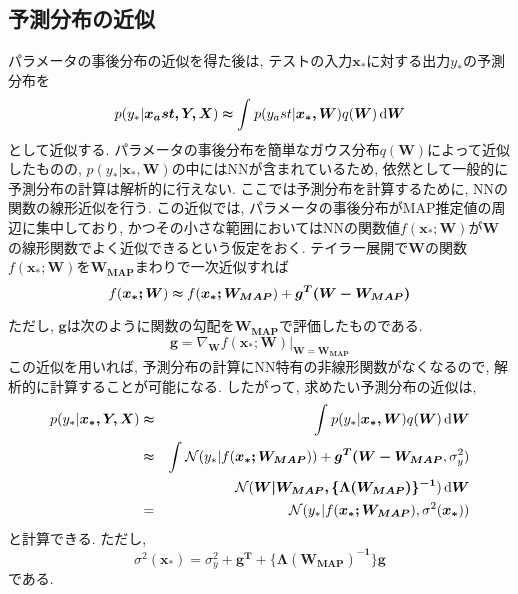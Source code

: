 \documentclass[twocolumn]{jarticle}
\begin{document}
\subsection{予測分布の近似}
パラメータの事後分布の近似を得た後は, テストの入力${\bm {x_\ast}}$に対する出力${y_\ast}$の予測分布を
\begin{equation}
  p(y_\ast|\bm {x_ast, Y, X}) \thickapprox \int_{}^{} p(y_ast | \bm {x_\ast, W})q(\bm {W}) \,\mathrm{d}{\bm {W}}
\end{equation}
として近似する. パラメータの事後分布を簡単なガウス分布${q(\bm {W})}$によって近似したものの, ${p(y_\ast|\bm {x_\ast, W})}$の中にはNNが含まれているため, 依然として一般的に予測分布の計算は解析的に行えない. ここでは予測分布を計算するために, NNの関数の線形近似を行う. この近似では, パラメータの事後分布がMAP推定値の周辺に集中しており, かつその小さな範囲においてはNNの関数値${f(\bm {x_\ast;W})}$が${\bm {W}}$の線形関数でよく近似できるという仮定をおく. テイラー展開で${\bm {W}}$の関数${f(\bm {x_\ast;W})}$を${\bm {W_{MAP}}}$まわりで一次近似すれば
\begin{equation}
  f(\bm {x_\ast;W}) \thickapprox f(\bm {x_\ast;W_{MAP}}) + \bm {g^T(W - W_{MAP})}
\end{equation}

ただし, ${\bm {g}}$は次のように関数の勾配を${\bm {W_{MAP}}}$で評価したものである.
\begin{equation}
  \bm {g} = \nabla_{\bm {W}}f(\bm {x_\ast ; W})|_{\bm {W = W_{MAP}}}
\end{equation}
この近似を用いれば, 予測分布の計算にNN特有の非線形関数がなくなるので, 解析的に計算することが可能になる. したがって, 求めたい予測分布の近似は,
\begin{eqnarray}
  p(y_\ast|\bm {x_\ast, Y, X}) &\thickapprox& \int_{}^{} p(y_\ast|\bm {x_\ast, W})q(\bm {W}) \,\mathrm{d}{\bm {W}} \nonumber \\
  &\thickapprox& \int_{}^{} \mathcal{N} (y_\ast | f(\bm {x_\ast; W_{MAP}})) + \bm {g^T (W - W_{MAP}}, \sigma_y^2) \nonumber \\
  && \mathcal{N} (\bm {W|W_{MAP}, \{ \Lambda (\bm {W_{MAP}})\}^{-1}}) \,\mathrm{d}{\bm W} \nonumber \\
  &=& \mathcal{N} (y_\ast|f(\bm {x_\ast; W_{MAP}}), \sigma^2 (\bm {x_\ast}))
\end{eqnarray}
と計算できる. ただし,
\begin{equation}
  \sigma^2(\bm {x_\ast}) = \sigma_y^2 + \bm {g^T + \{\Lambda (W_{MAP})^{-1}\}g}
\end{equation}
である.
\end{document}
